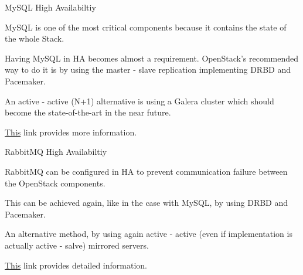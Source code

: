 \documentclass[english,serif,mathserif]{beamer}
\begin{document}
\begin{frame}{MySQL High Availabiltiy}

MySQL is one of the most critical components because it contains
the state of the whole Stack.

\vspace{5 mm}

Having MySQL in HA becomes almost a requirement. OpenStack's recommended way to 
do it is by using the master - slave replication implementing DRBD and Pacemaker.

\vspace{5mm}

An active - active (N+1) alternative is using a Galera cluster which should become the 
state-of-the-art in the near future. 

\vspace{5 mm}

{\color{blue}\href{http://docs.openstack.org/high-availability-guide/content/s-mysql.html}{This}} 
link provides more information.

\end{frame}

\begin{frame}{RabbitMQ High Availabiltiy}

RabbitMQ can be configured in HA to prevent communication failure between the OpenStack components.

\vspace{5 mm}

This can be achieved again, like in the case with MySQL, by using DRBD and Pacemaker. 

\vspace{5mm}

An alternative method, by using again active - active 
(even if implementation is actually active - salve) mirrored servers. 

\vspace{5 mm}

{\color{blue}\href{http://docs.openstack.org/high-availability-guide/content/s-rabbitmq.html}{This}} 
link provides detailed information. 

\end{frame}
\end{document}
